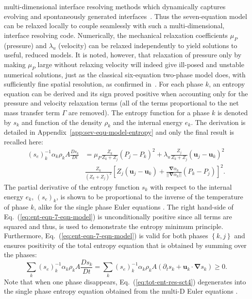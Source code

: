 \documentclass[preprint,10pt]{elsarticle}
\newcommand{\grad}{\mbold{\nabla}}
\newcommand{\mbold}[1]{\boldsymbol#1}
\newcommand{\eqt}[1]{Eq.~(\ref{#1})}                     %
\newcommand{\app}[1]{Appendix~\ref{#1}}                   %
\begin{document}
multi-dimensional interface resolving methods which dynamically
captures evolving and spontaneously generated
interfaces~\cite{Saurel_2009}. Thus the seven-equation model
can be relaxed locally to couple seamlessly with such a
multi-dimensional, interface resolving code. Numerically, the mechanical relaxation coefficients $\mu_P$
(pressure) and $\lambda_u$ (velocity) can be relaxed independently to
yield solutions to useful, reduced models.  It
is noted, however, that relaxation of pressure only by making $\mu_P$
large without relaxing velocity will indeed give ill-posed and
unstable numerical solutions, just as the classical six-equation
two-phase model does, with sufficiently fine spatial resolution, as
confirmed in~\cite{SEM,Herrard_2005}. For each phase $k$, an entropy equation can be derived and its sign proved positive when accounting only for the pressure and velocity relaxation terms (all of the terms proportional to the net mass transfer term $\Gamma$ are removed). The entropy function for a phase $k$ is denoted by $s_k$ and function of the density $\rho_k$ and the internal energy $e_k$. The derivation is detailed in \app{app:sev-equ-model-entropy} and only the final result is recalled here:
%
\begin{align}\label{eq:ent-eqn-7-eqn-model}
(s_{e})_k^{-1} \alpha_k \rho_k A \frac{Ds_k}{Dt} &= \mu_P \frac{Z_k}{Z_k+Z_j} (P_j - P_k)^2 + \lambda_u \frac{Z_j}{Z_k+Z_j} (\mbold u_j -\mbold  u_k)^2 \nonumber
\\
& \frac{Z_k}{\left( Z_k+Z_j \right)^2} \left[ Z_j (\mbold u_j-\mbold u_k)+\frac{\grad \alpha_k}{|| \grad \alpha_k ||}(P_k-P_j)\right]^2.
\end{align}
The partial derivative of the entropy function $s_k$ with respect to the internal energy $e_k$, $(s_e)_k$, is shown to be proportional to the inverse of the temperature of phase $k$, alike for the single phase Euler equations \cite{jlg, Marco_dissertation}. The right hand-side of \eqt{eq:ent-eqn-7-eqn-model} is unconditionally positive since all terms are squared and thus, is used to demonstrate the entropy minimum principle. Furthermore, \eqt{eq:ent-eqn-7-eqn-model} is valid for both phases $\left\{k, j\right\}$ and ensures positivity of the total entropy equation that is obtained by summing over the phases:
%
\begin{equation}\label{eq:tot-ent-res-sct4}
\sum_k (s_{e})_k^{-1} \alpha_k \rho_k A \frac{Ds_k}{Dt} = \sum_k (s_{e})_k^{-1} \alpha_k \rho_k A \left( \partial_t s_k + \mbold u_k \cdot \grad s_k \right) \geq 0  .
\end{equation}
%
Note that when one phase disappears, \eqt{eq:tot-ent-res-sct4} degenerates into the single phase entropy equation obtained from the multi-D Euler equations \cite{SEM, Marco_dissertation}.
\end{document}
